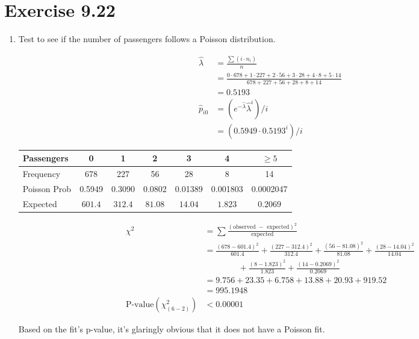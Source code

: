 \documentclass{article}
\begin{document}
\section*{Exercise 9.22}

\begin{enumerate}[\quad(a)]
\item Test to see if the number of passengers follows a Poisson distribution.

\begin{align*}
	\hat{\lambda} &= \frac{\sum (i \cdot n_i)}{n}\\
	&= \frac{ 0 \cdot 678 + 1 \cdot 227 + 2 \cdot 56 + 3 \cdot 28  + 4 \cdot 8 + 5 \cdot 14}{678 + 227 + 56 + 28 + 8 + 14} \\
	&= 0.5193 \\
	\hat{p}_{i0} &= (e^{-\hat{\lambda}}\hat{\lambda}^i) / i\\
	&= (0.5949 \cdot 0.5193^i)/i
\end{align*}

\begin{center}
	\begin{tabular}{|l|c|c|c|c|c|c|}
	\hline
	Passengers & 0 & 1 & 2 & 3 & 4 & $\geq 5$ \\ 
	\hline
	Frequency & 678 & 227 & 56 & 28 & 8 & 14 \\
	\hline
	Poisson Prob & 0.5949 & 0.3090 & 0.0802 & 0.01389 & 0.001803 & 0.0002047 \\
	\hline
	Expected & $\mathit{601.4}$ & $\mathit{312.4}$ & $\mathit{81.08}$ & $\mathit{14.04}$ & $\mathit{1.823}$ & $\mathit{0.2069}$ \\
	\hline
	\end{tabular}
\end{center}

\begin{align*}
	\chi^2 &= \sum \frac{(\text{observed } - \text{ expected})^2}{\text{expected}}\\
	&= \frac{(678 - 601.4)^2}{601.4} + \frac{(227 - 312.4)^2}{312.4} + \frac{(56 - 81.08)^2}{81.08} + \frac{(28 - 14.04)^2}{14.04} \\
	&\qquad\qquad + \frac{(8 - 1.823)^2}{1.823} + \frac{(14 - 0.2069)^2}{0.2069} \\
	&= 9.756 + 23.35 + 6.758 + 13.88 + 20.93 + 919.52\\
	&= 995.1948 \\
	\text{P-value}(\chi^2_{(6-2)}) &< 0.00001
\end{align*}

Based on the fit's p-value, it's glaringly obvious that it does not have a Poisson fit.


\end{enumerate}
\end{document}
